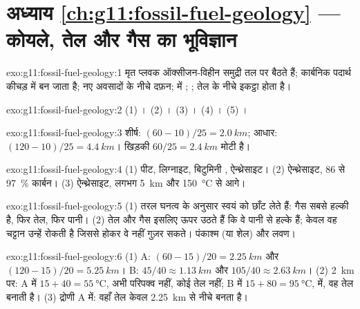 \section*{अध्याय \ref{ch:g11:fossil-fuel-geology} --- कोयले, तेल और गैस का भूविज्ञान}

\begin{solution}{exo:g11:fossil-fuel-geology:1}
मृत प्लवक ऑक्सीजन-विहीन समुद्री तल पर बैठते हैं; कार्बनिक पदार्थ
कीचड़ में  बन जाता है; नए अवसादों के नीचे दफ़न;  में
; ; तेल  के नीचे इकट्ठा होता है।
\end{solution}

\begin{solution}{exo:g11:fossil-fuel-geology:2}
(1) । (2) । (3) । (4) । (5) ।
\end{solution}

\begin{solution}{exo:g11:fossil-fuel-geology:3}
शीर्ष: $(60 - 10)/25 = \qty{2.0}{km}$; आधार: $(120 - 10)/25 = \qty{4.4}{km}$।
खिड़की $60/25 = \qty{2.4}{km}$ मोटी है।
\end{solution}

\begin{solution}{exo:g11:fossil-fuel-geology:4}
(1) पीट, लिग्नाइट, बिटुमिनी , ऐन्थ्रेसाइट। (2) ऐन्थ्रेसाइट, 86 से
\qty{97}{\percent} कार्बन। (3) ऐन्थ्रेसाइट, लगभग \qty{5}{km} और
\qty{150}{\degreeCelsius} से आगे।
\end{solution}

\begin{solution}{exo:g11:fossil-fuel-geology:5}
(1) तरल घनत्व के अनुसार स्वयं को छाँट लेते हैं: गैस सबसे हल्की है, फिर तेल,
फिर पानी। (2) तेल और गैस इसलिए ऊपर उठते हैं कि वे पानी से हल्के हैं; केवल
वह चट्टान उन्हें रोकती है जिससे होकर वे नहीं गुज़र सकते। पंकाश्म (या शेल) और लवण।
\end{solution}

\begin{solution}{exo:g11:fossil-fuel-geology:6}
(1) A: $(60 - 15)/20 = \qty{2.25}{km}$ और $(120 - 15)/20 = \qty{5.25}{km}$।
B: $45/40 \approx \qty{1.13}{km}$ और $105/40 \approx \qty{2.63}{km}$।
(2) \qty{2}{km} पर: A में $15 + 40 = \qty{55}{\degreeCelsius}$, अभी
परिपक्व नहीं, कोई तेल नहीं; B में $15 + 80 = \qty{95}{\degreeCelsius}$, 
में, वह तेल बनाती है। (3) द्रोणी A में: वहाँ तेल केवल
\qty{2.25}{km} से नीचे बनता है।
\end{solution}

